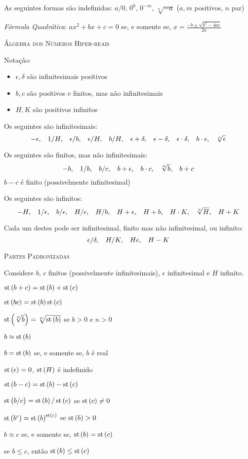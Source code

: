As seguintes formas são indefinidas:
$a/0$, $0^0$, $0^{-m}$, $\sqrt[n]{-a}$ ($a,m$ positivos, $n$ par)

\emph{Fórmula Quadrática}: $\displaystyle a x^2 + b x + c = 0$ se, e somente se,
$\displaystyle x = \frac{-b \pm \sqrt{b^2 - 4ac}}{2a}$


\textsc{Álgebra dos Números Hiper-reais}

Notação:
\begin{itemize}
\item $\epsilon, \delta$ são infinitesimais positivos
\item $b,c$ são positivos e finitos, mas não infinitesimais
\item $H,K$ são positivos infinitos
\end{itemize}

Os seguintes são infinitesimais:
\[
 -\epsilon, \hspace{2ex}  1/H, \hspace{2ex}  \epsilon/b, \hspace{2ex}  \epsilon/H, \hspace{2ex}  b/H, \hspace{2ex}  \epsilon + \delta, \hspace{2ex}  \epsilon - \delta, \hspace{2ex}  \epsilon \cdot \delta, \hspace{2ex}  b \cdot \epsilon, \hspace{2ex}  \sqrt[n]{\epsilon}
\]

Os seguintes são finitos, mas não infinitesimais:
\[
 -b, \hspace{2ex} 1/b, \hspace{2ex} b/c, \hspace{2ex} b + \epsilon, \hspace{2ex} b \cdot c, \hspace{2ex} \sqrt[n]{b},
 \hspace{2ex} b+c
\]
$b-c$ é finito (possivelmente infinitesimal)

Os seguintes são infinitos:
\[
 -H, \hspace{2ex}  1/\epsilon, \hspace{2ex}  b/\epsilon, \hspace{2ex}  H/\epsilon, \hspace{2ex}  H/b, \hspace{2ex}  H+\epsilon, \hspace{2ex}  H+b, \hspace{2ex}  H\cdot K, \hspace{2ex}  \sqrt[n]{H}, \hspace{2ex}  H+K
\]

Cada um destes pode ser infinitesimal, finito mas não infinitesimal,
ou infinito:
\[
 \epsilon/\delta, \hspace{2ex} H/K, \hspace{2ex} H\epsilon, \hspace{2ex} H - K
\]

\textsc{Partes Padronizadas}

Considere $b$, $c$ finitos (possivelmente infinitesimais),
$\epsilon$ infinitesimal e $H$ infinito.

\begin{multicols}{2}
$\operatorname{st}\left(b + c\right) = \operatorname{st}\left(b\right) + \operatorname{st}\left(c\right)$

$\operatorname{st}\left(b c\right) = \operatorname{st}\left(b\right) \operatorname{st}\left(c\right)$

$\operatorname{st}\left(\sqrt[n]{b}\right) = \sqrt[n]{\operatorname{st}\left(b\right)}$ se $b > 0$ e $n > 0$

$b \approx \operatorname{st}\left(b\right)$

$b = \operatorname{st}\left(b\right)$ se, e somente se, $b$ é real

$\operatorname{st}\left(\epsilon\right) = 0$, \SPC $\operatorname{st}\left(H\right)$ é indefinido

$\operatorname{st}\left(b - c\right) = \operatorname{st}\left(b\right) - \operatorname{st}\left(c\right)$

$\operatorname{st}\left(b/c\right) = \operatorname{st}\left(b\right) / \operatorname{st}\left(c\right)$ se $\operatorname{st}\left(c\right) \ne 0$

$\operatorname{st}\left(b^c\right) = \operatorname{st}\left(b\right)^{\operatorname{st}\left(c\right)}$ se $\operatorname{st}\left(b\right) > 0$

$b \approx c$ se, e somente se, $\operatorname{st}\left(b\right) = \operatorname{st}\left(c\right)$

se $b \le c$, então $\operatorname{st}\left(b\right) \le \operatorname{st}\left(c\right)$\\
\end{multicols}

